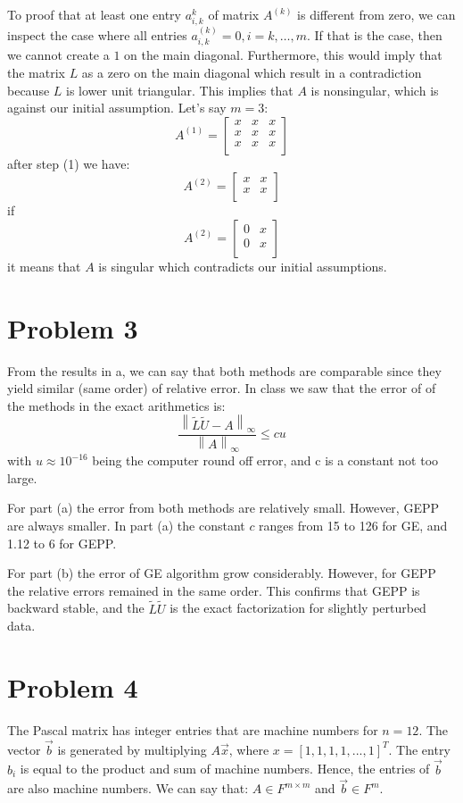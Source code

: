 \documentclass[10pt]{article}
\newcommand{\normi}[1]{\left\lVert#1\right\rVert_\infty}
\begin{document}
To proof that at least one entry $a_{i,k}^{k}$ of matrix $A^{(k)}$
is different from zero, we can inspect the case where all entries 
$a_{i,k}^{(k)}=0, i=k,\dots,m$. If that is the case, then we cannot
create a $1$ on the main diagonal. Furthermore, this would imply that
the matrix $L$ as a zero on the main diagonal which result in a 
contradiction because $L$ is lower unit triangular.
This implies that $A$ is nonsingular, which is against our initial assumption. Let's say $m=3$:
  \[
    A^{(1)} = 
    \begin{bmatrix}
        x  & x & x \\
        x  & x & x \\
        x  & x & x \\
     \end{bmatrix}
  \]
  after step (1) we have:
  \[
    A^{(2)} = 
    \begin{bmatrix}
           x & x \\
           x & x \\
     \end{bmatrix}
  \]
  if 
  \[
    A^{(2)} = 
    \begin{bmatrix}
           0 & x \\
           0 & x \\
     \end{bmatrix}
  \]
  it means that $A$ is singular which contradicts our initial assumptions.


\section{Problem 3}
From the results in a, we can say that both methods are comparable
since they yield similar (same order) of relative error. In class
we saw that the error of of the methods in the exact arithmetics 
is:
  \[
  \frac{\normi{\tilde{L}\tilde{U}-A}}{\normi{A}} \leq cu
  \]
with $u\approx 10^{-16}$ being the computer round off error, and
c is a constant not too large.

For part (a) the error from both methods are relatively small. However,
 GEPP are always smaller. In part (a) the constant $c$ ranges from 15 to 
126 for GE, and 1.12 to 6 for GEPP.

For part (b) the error of GE algorithm grow considerably. However, for 
GEPP the relative errors remained in the same order. This confirms 
that GEPP is backward stable, and the $\tilde{L}\tilde{U}$ is the
exact factorization for slightly perturbed data.

\section{Problem 4}
The Pascal matrix has integer entries that are machine numbers for 
$n=12$. The vector $\vec{b}$ is generated by multiplying 
$A\vec{x}$, where $x = [1,1,1,1,...,1]^T$. The entry
$b_i$ is equal to the product and sum of machine numbers. Hence,
the entries of $\vec{b}$ are also machine numbers. We can say that:
$A \in F^{m \times m}$ and $\vec{b} \in F^m$.
 
\end{document}
